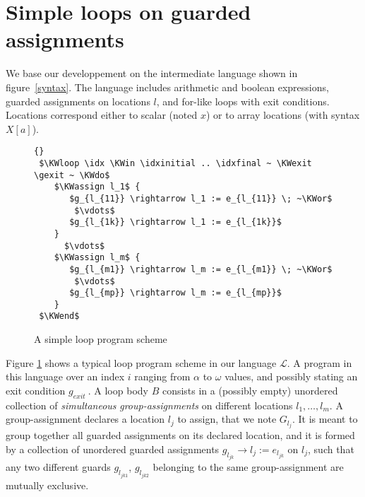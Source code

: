 \documentclass[a4paper,10pt]{article}
\newcommand{\prog}{\ensuremath{\mathcal{L}}\xspace}
\newcommand{\idx}{\ensuremath{i}\xspace}
\newcommand{\idxinitial}{\ensuremath{\alpha}\xspace}
\newcommand{\idxfinal}{\ensuremath{\omega}\xspace}
\newcommand{\KWloop}{\ensuremath{\mathrm{\textbf{loop}}~}}
\newcommand{\KWdo}{\ensuremath{\mathrm{\textbf{do}}~}}
\newcommand{\KWend}{\ensuremath{\mathrm{\textbf{end}}}}
\newcommand{\KWin}{\ensuremath{~\mathrm{\textbf{in}}~}}
\newcommand{\KWexit}{\ensuremath{\mathrm{\textbf{exit when}}~}}
\newcommand{\KWassign}{\ensuremath{\mathrm{\textbf{assign}}~}}
\newcommand{\KWor}{\ensuremath{\mathrm{\textbf{or}}~}}
\newcommand{\gexit}{\ensuremath{\mathit{g_{exit}~}}}
\begin{document}
\section{Simple loops on guarded assignments}
\label{sec:simple-loops}
We base our developpement on the intermediate language shown in figure~\ref{syntax}.
The language includes arithmetic and boolean  expressions, guarded assignments on 
locations $l$, and for-like loops with exit conditions. Locations  correspond 
either to scalar (noted $x$) or to array locations (with syntax $X[a]$).
\begin{figure}
\centering
\begin{lstlisting}[mathescape, frame=single, flexiblecolumns=false]{} 
 $\KWloop \idx \KWin \idxinitial .. \idxfinal ~ \KWexit \gexit ~ \KWdo$
    $\KWassign l_1$ {
       $g_{l_{11}} \rightarrow l_1 := e_{l_{11}} \; ~\KWor$
        $\vdots$
       $g_{l_{1k}} \rightarrow l_1 := e_{l_{1k}}$
    }
      $\vdots$
    $\KWassign l_m$ { 
       $g_{l_{m1}} \rightarrow l_m := e_{l_{m1}} \; ~\KWor$
        $\vdots$
       $g_{l_{mp}} \rightarrow l_m := e_{l_{mp}}$ 
    }
 $\KWend$
\end{lstlisting}
\caption{A simple loop program scheme}\label{program-scheme}
\end{figure}
%
Figure \ref{program-scheme} shows a typical loop program scheme in our language \prog. 
A program in this language over an index \idx ranging from \idxinitial to \idxfinal values, 
and possibly stating an exit condition \gexit. 
A loop body $B$ consists in a (possibly empty) unordered collection of \emph{simultaneous} 
\textit{group-assignments} on different locations $l_1, \ldots, l_m$.
A group-assignment declares a location $l_j$ to assign, that we note $G_{l_j}$.  
It is meant to group together all guarded assignments on its declared location, 
and it is formed by  a collection of unordered guarded assignments 
$g_{l_{jk}} \rightarrow l_j := e_{l_{jk}}$ on $l_j$, such that any  two different guards 
$g_{l_{jk1}}$, $g_{l_{jk2}}$ belonging to the same group-assignment are mutually exclusive.
\end{document}
